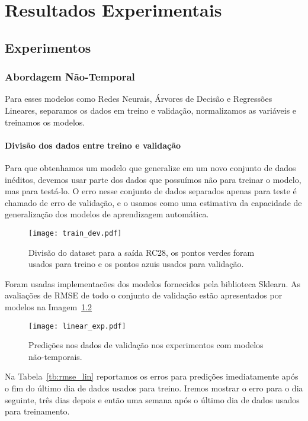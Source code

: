 \chapter{ Resultados Experimentais }
\label{cap:resultados}
\section{Experimentos}




\subsection{Abordagem Não-Temporal}

Para esses modelos como Redes Neurais, Árvores de Decisão e Regressões
Lineares, separamos os dados em treino e validação, normalizamos as variáveis e
treinamos os modelos. 

\subsubsection{Divisão dos dados entre treino e validação}

Para que obtenhamos um modelo que generalize em um novo conjunto de dados
inéditos, devemos usar parte dos dados que possuímos não para treinar o modelo,
mas para testá-lo. O erro nesse conjunto de dados separados apenas para teste é
chamado de erro de validação, e o usamos como uma estimativa da capacidade de
generalização dos modelos de aprendizagem automática.

\begin{figure}[H]
  \centering
  \texttt{[image: train\_dev.pdf]}
  \caption{Divisão do dataset para a saída RC28, os pontos verdes foram usados para
    treino e os pontos azuis usados para validação.}
  \label{fig:divrc28}
\end{figure}

Foram usadas implementacões dos modelos fornecidos pela biblioteca Sklearn.
As avaliações de RMSE de todo o conjunto de validação estão apresentados por modelos na Imagem~\ref{fig:linmodels}  

\begin{figure}[H]
  \centering
\texttt{[image: linear\_exp.pdf]}
\caption{Predições nos dados de validação nos experimentos com modelos não-temporais. }
\label{fig:linmodels}
\end{figure}

Na Tabela~\ref{tb:rmse_lin} reportamos os erros para predições imediatamente
após o fim do último dia de dados usados para treino. Iremos mostrar o
erro para o dia seguinte, três dias depois e então uma semana após o último dia
de dados usados para treinamento.

